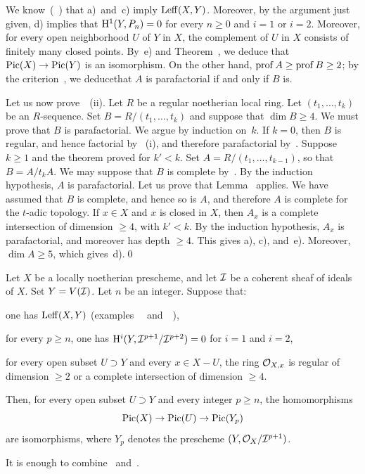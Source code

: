 \enlargethispage{5mm}%
We know~(~) that a)~and~c) imply $\operatorname{Leff}(X, Y)$. Moreover, by the argument just given, d) implies that $\mathrm H^1(Y, P_n)=0$ for every $n\geq 0$ and $i=1$ or $i=2$. Moreover, for every open neighborhood $U$ of $Y$ in $X$, the complement of $U$ in $X$ consists of finitely many closed points. By~e) and Theorem~, we deduce that $\operatorname{Pic}(X)\to \operatorname{Pic}(Y)$ is an isomorphism. On the other hand, $\operatorname{prof} A\geq \operatorname{prof} B\geq 2$; by the criterion~, we deduce\pageoriginale that $A$ is parafactorial if and only if $B$ is.

Let us now prove~~(ii). Let $R$ be a regular noetherian local ring. Let $(t_1, \ldots, t_k)$ be an $R$-sequence. Set $B=R/(t_1, \ldots, t_k)$ and suppose that $\dim B\geq 4$. We must prove that $B$ is parafactorial. We argue by induction on~$k$. If $k=0$, then $B$ is regular, and hence factorial by ~(i), and therefore parafactorial by~. Suppose $k\geq 1$ and the theorem proved for $k'<k$. Set $A=R/(t_1, \ldots, t_{k-1})$, so that $B=A/t_k A$. We may suppose that $B$ is complete by~. By the induction hypothesis, $A$ is parafactorial. Let us prove that Lemma~ applies. We have assumed that $B$ is complete, and hence so is $A$, and therefore $A$ is complete for the $t$-adic topology. If $x\in X$ and $x$ is closed in $X$, then $A_x$ is a complete intersection of dimension $\geq 4$, with $k'<k$. By the induction hypothesis, $A_x$ is parafactorial, and moreover has depth $\geq 4$. This gives a), c), and~e). Moreover, $\dim A\geq 5$, which gives~d).\qed

\begin{theoreme} \label{XI.3.18}
Let $X$ be a locally noetherian prescheme, and let $\mathcal I$ be a coherent sheaf of ideals of $X$. Set $Y=V(\mathcal I)$. Let $n$ be an integer. Suppose that:
\begin{enumeratei}
\item
one has $\operatorname{Leff}(X, Y)$ (\cf examples ~~and~~),
\item
for every $p\geq n$, one has $\mathrm H^i(Y, \mathcal I^{p+1}/\mathcal I^{p+2})=0$ for $i=1$ and $i=2$,
\item
for every open subset $U\supset Y$ and every $x\in X-U$, the ring $\mathcal O_{X,x}$ is regular of dimension $\geq 2$ or a complete intersection of dimension $\geq 4$.
\end{enumeratei}
\noindent
Then, for every open subset $U\supset Y$ and every integer $p\geq n$, the homomorphisms
\[
\operatorname{Pic}(X)\to\operatorname{Pic}(U)\to\operatorname{Pic}(Y_p)
\]
are isomorphisms, where $Y_p$ denotes the prescheme $(Y, \mathcal O_X/\mathcal I^{p+1})$.
\end{theoreme}

It is enough to combine ~and~.
